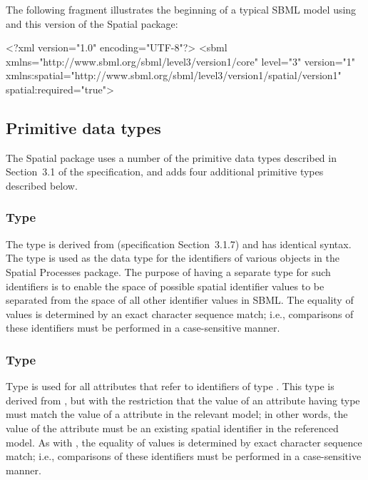 The following fragment illustrates the beginning of a typical SBML model using \sbmlthreecore and this version of the Spatial package:

\begin{example}
<?xml version="1.0" encoding="UTF-8"?>
<sbml xmlns="http://www.sbml.org/sbml/level3/version1/core" level="3" version="1"
      xmlns:spatial="http://www.sbml.org/sbml/level3/version1/spatial/version1"
      spatial:required="true">
\end{example}


\subsection{Primitive data types}
\label{new-primitive-types}

The Spatial package uses a number of the primitive data types described in Section~3.1 of the \sbmlthreecore specification, and adds four additional primitive types described below.


\subsubsection{Type \fixttspace{}}
\label{primtype-spid}

The type  is derived from 
(\sbmlthreecore specification Section~3.1.7) and has identical syntax. The  type is used as the data type for the identifiers of various objects in the Spatial Processes package.  The purpose of having a separate type for such identifiers is to enable the space of possible spatial identifier values to be separated from the space of all other identifier values in SBML.  The equality of  values is determined by an exact character sequence match; i.e., comparisons of these identifiers must be performed in a case-sensitive manner.


\subsubsection{Type \fixttspace{}}
\label{primtype-spidref}

Type  is used for all attributes that refer to identifiers of type .  This type is derived from , but with the restriction that the value of an attribute having type  must match the value of a  attribute in the relevant model;  in other words, the value of the attribute must be an existing spatial identifier in the referenced model.  As with , the equality of  values is determined by exact character sequence match; i.e., comparisons of these identifiers must be performed in a case-sensitive manner.


